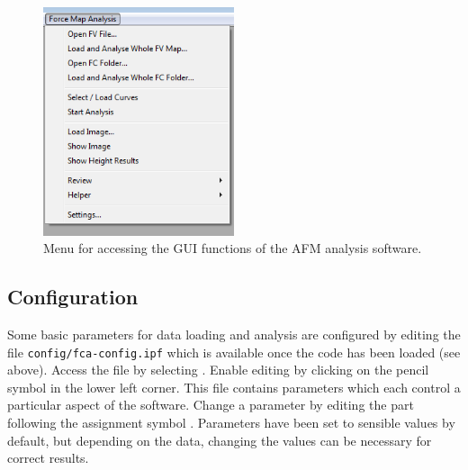 \documentclass[12pt,a4paper]{article}
\begin{document}
\begin{figure}[htbp]
	\centering
		\includegraphics[width=0.5\textwidth]{fig--afmsoftware-mainmenu.png}
	\caption[AFM analysis software menu]{Menu for accessing the GUI functions of the AFM analysis software.}
	\label{fig:afmsoftware-mainmenu}
\end{figure}


\subsection{Configuration}
\label{sec:afmsoftware-configvars}
Some basic parameters for data loading and analysis are configured by editing the file \texttt{config/fca-config.ipf} which is available once the code has been loaded (see above).
Access the file by selecting . Enable editing by clicking on the pencil symbol in the lower left corner.
This file contains parameters which each control a particular aspect of the software. Change a parameter by editing the part following the assignment symbol \keys{=}.
Parameters have been set to sensible values by default, but depending on the data, changing the values can be necessary for correct results.
\end{document}

